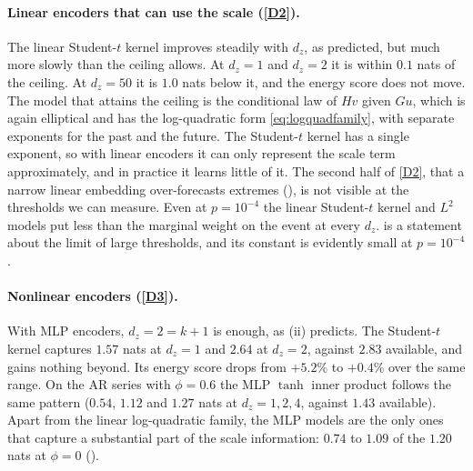 \documentclass[11pt]{article}
\theoremstyle{plain}
\theoremstyle{definition}
\theoremstyle{remark}
\begin{document}
\paragraph{Linear encoders that can use the scale (\ref{D2}).} The linear
Student-$t$ kernel improves steadily with $d_z$, as predicted, but much more
slowly than the ceiling allows. At $d_z=1$ and $d_z=2$ it is within $0.1$
nats of the ceiling. At $d_z=50$ it is $1.0$ nats below it, and the energy
score does not move. The model that attains the ceiling is the conditional law of
$Hv$ given $Gu$, which is again elliptical and has the log-quadratic form
\eqref{eq:logquadfamily}, with separate exponents for the past and the
future. The Student-$t$ kernel has a single exponent, so with linear
encoders it can only represent the scale term approximately, and in practice
it learns little of it. The second half of \ref{D2}, that a narrow linear
embedding over-forecasts extremes (), is not visible at
the thresholds we can measure. Even at $p=10^{-4}$ the linear Student-$t$
kernel and $L^2$ models put less than the marginal weight on the event at
every $d_z$.  is a statement about the limit of large
thresholds, and its constant is evidently small at $p=10^{-4}$.

\paragraph{Nonlinear encoders (\ref{D3}).} With MLP encoders, $d_z=2=k+1$ is
enough, as (ii) predicts. The Student-$t$ kernel
captures $1.57$ nats at $d_z=1$ and $2.64$ at $d_z=2$, against $2.83$
available, and gains nothing beyond. Its energy score drops from $+5.2\%$ to
$+0.4\%$ over the same range. On the AR series with $\phi=0.6$ the MLP
$\tanh$ inner product follows the same pattern ($0.54$, $1.12$ and $1.27$ nats
at $d_z=1,2,4$, against $1.43$ available). Apart from the linear log-quadratic family, the MLP models are the only ones
that capture a substantial part of the scale information: $0.74$ to $1.09$ of
the $1.20$ nats at $\phi=0$ ().
\end{document}
